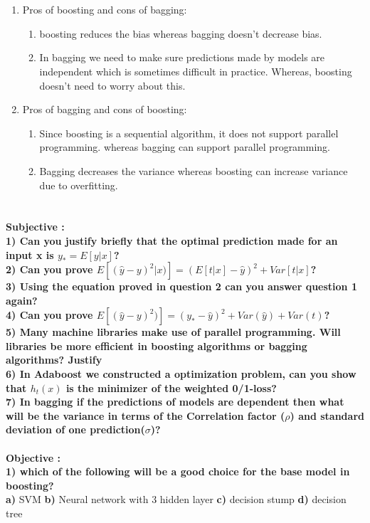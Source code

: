 \documentclass{homework}
\begin{document}
\section{}
\begin{enumerate}
    \item Pros of boosting and cons of bagging:
        \begin{enumerate}
            \item boosting reduces the bias whereas bagging doesn't decrease bias.
            \item In bagging we need to make sure predictions made by models are independent which is sometimes difficult in practice. Whereas, boosting doesn't need to worry about this.
        \end{enumerate}
    \item Pros of bagging and cons of boosting:
        \begin{enumerate}
            \item Since boosting is a sequential algorithm, it does not support parallel programming. whereas bagging can support parallel programming. 
            \item Bagging decreases the variance whereas boosting can increase variance due to overfitting.
        \end{enumerate}
\end{enumerate}



\section{}
\textbf{Subjective : \\}
\textbf{1) Can you justify briefly that the optimal prediction made for an input x is $y_* = E[y|x]$?\\
2) Can you prove $E[(\hat{y} - y)^2|x)] = (E[t|x] - \hat{y})^2 + Var[t|x]$?\\
3) Using the equation proved in question 2 can you answer question 1 again?\\
4) Can you prove $E[(\hat{y} - y)^2)] = (y_* - \hat{y})^2 + Var(\hat{y}) + Var(t)$?\\
5) Many machine libraries make use of parallel programming. Will libraries be more efficient in boosting algorithms or bagging algorithms? Justify\\
6) In Adaboost we constructed a optimization problem, can you show that $h_t(x)$ is the minimizer of the weighted 0/1-loss?\\
7) In bagging if the predictions of models are dependent then what will be the variance in terms of the Correlation factor ($\rho$) and standard deviation of one prediction($\sigma$)?}\\
 \\
\textbf{Objective :}\\
\textbf{1) which of the following will be a good choice for the base model in boosting?}\\
\textbf{a)} SVM
\indent \textbf{b)} Neural network with 3 hidden layer
\indent \textbf{c)} decision stump 
\indent \textbf{d)} decision tree
\end{document}
